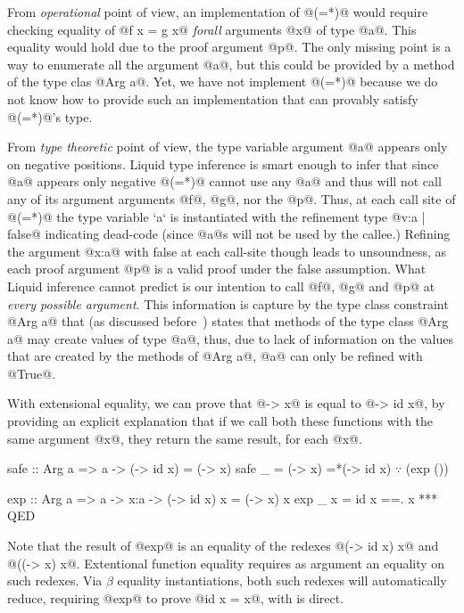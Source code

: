 From \textit{operational} point of view,
an implementation of @(=*)@ would require checking 
equality of @f x = g x@ \textit{forall} arguments @x@ of type @a@. 
%
This equality would hold due to the proof argument @p@. 
%
The only missing point is a way to enumerate all the argument @a@, 
but this could be provided by a method of the type clas @Arg a@. 
%
Yet, we have not implement @(=*)@ because we do not know how to 
provide such an implementation that can provably satisfy @(=*)@'s type.

From \textit{type theoretic} point of view, 
the type variable argument @a@
appears only on negative positions. 
%
Liquid type inference is smart enough to infer that 
since @a@ appears only negative @(=*)@ cannot use any @a@
and thus will not call any of its argument arguments @f@, @g@, nor the @p@. 
%
Thus, at each call site of @(=*)@ the type variable `a` is instantiated
with the refinement type @{v:a | false}@ indicating dead-code 
(since @a@s will not be used by the callee.)
%
Refining the argument @x:a@ with false at each call-site though
leads to unsoundness, as each proof argument @p@ is a valid proof under 
the false assumption. 
%
What Liquid inference cannot predict is our intention to call 
@f@, @g@ and @p@ at \textit{every possible argument}. 
%
This information is capture by the type class constraint @Arg a@
that (as discussed before~\citep{Vazou13}) states that methods of 
the type class 
@Arg a@ may create values of type @a@, thus, 
due to lack of information on the values that are created by the
methods of @Arg a@, @a@ can only be refined with @True@.

With extensional equality, we can prove 
that @\x -> x@ is equal to @\x -> id x@, 
by providing an explicit explanation that 
if we call both these functions with the same 
argument @x@, they return the same result, for each @x@.
%
\begin{mcode}
 safe :: Arg a => a 
       -> {(\x -> id x) = (\x -> x)}
 safe _  = (\x -> x) 
         =*(\x -> id x) $\because$ (exp ())
 
 exp :: Arg a => a -> x:a 
     -> {(\x -> id x) x = (\x -> x) x}
 exp _ x =  id x 
         ==. x
         *** QED
\end{mcode} 
%
Note that the result of @exp@ 
is an equality of the redexes 
@(\x -> id x) x@ and @((\x -> x) x@. 
%
Extentional function equality requires 
as argument an equality on such redexes. 
%
Via $\beta$ equality instantiations, 
both such redexes will automatically reduce, 
requiring @exp@ to prove @id x = x@, 
with is direct.  

